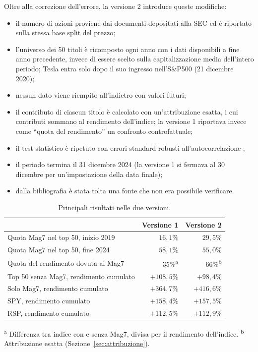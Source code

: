 \documentclass[12pt, a4paper]{article}
\begin{document}
Oltre alla correzione dell'errore, la versione 2 introduce queste modifiche:
\begin{itemize}
  \item il numero di azioni proviene dai documenti depositati alla SEC \citep{secedgar} ed \`e riportato sulla stessa base split del prezzo;
  \item l'universo dei 50 titoli \`e ricomposto ogni anno con i dati disponibili a fine anno precedente, invece di essere scelto sulla capitalizzazione media dell'intero periodo; Tesla entra solo dopo il suo ingresso nell'S\&P500 (21 dicembre 2020);
  \item nessun dato viene riempito all'indietro con valori futuri;
  \item il contributo di ciascun titolo \`e calcolato con un'attribuzione esatta, i cui contributi sommano al rendimento dell'indice; la versione 1 riportava invece come ``quota del rendimento'' un confronto controfattuale;
  \item il test statistico \`e ripetuto con errori standard robusti all'autocorrelazione \citep{neweywest1987};
  \item il periodo termina il 31 dicembre 2024 (la versione 1 si fermava al 30 dicembre per un'impostazione della data finale);
  \item dalla bibliografia \`e stata tolta una fonte che non era possibile verificare.
\end{itemize}

\begin{table}[H]
  \centering
  \caption{Principali risultati nelle due versioni.}
  \begin{tabular}{lrr}
    \toprule
    & Versione 1 & Versione 2 \\
    \midrule
    Quota Mag7 nel top 50, inizio 2019      & $16{,}1\%$  & $29{,}5\%$ \\
    Quota Mag7 nel top 50, fine 2024        & $58{,}1\%$  & $55{,}0\%$ \\
    Quota del rendimento dovuta ai Mag7     & $35\%$\textsuperscript{a} & $66\%$\textsuperscript{b} \\
    Top 50 senza Mag7, rendimento cumulato  & $+108{,}5\%$ & $+98{,}4\%$ \\
    Solo Mag7, rendimento cumulato          & $+364{,}7\%$ & $+416{,}6\%$ \\
    SPY, rendimento cumulato                & $+158{,}4\%$ & $+157{,}5\%$ \\
    RSP, rendimento cumulato                & $+112{,}5\%$ & $+112{,}9\%$ \\
    \bottomrule
  \end{tabular}
  \par\smallskip
  \footnotesize\textsuperscript{a} Differenza tra indice con e senza Mag7, divisa per il rendimento dell'indice. \textsuperscript{b} Attribuzione esatta (Sezione~\ref{sec:attribuzione}).
  \label{tab:revisione}
\end{table}
\end{document}

